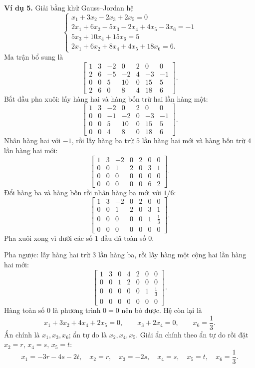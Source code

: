 \documentclass[12pt,a4paper]{article}
\begin{document}
\textbf{Ví dụ 5.} Giải bằng khử Gauss--Jordan hệ
$$
\begin{cases}
x_1+3x_2-2x_3+2x_5=0 \\
2x_1+6x_2-5x_3-2x_4+4x_5-3x_6=-1 \\
5x_3+10x_4+15x_6=5 \\
2x_1+6x_2+8x_4+4x_5+18x_6=6.
\end{cases}
$$
Ma trận bổ sung là
$$
\left[ \begin{array}{cccccc|c} 1 & 3 & -2 & 0 & 2 & 0 & 0 \\ 2 & 6 & -5 & -2 & 4 & -3 & -1 \\ 0 & 0 & 5 & 10 & 0 & 15 & 5 \\ 2 & 6 & 0 & 8 & 4 & 18 & 6 \end{array} \right].
$$
Bắt đầu pha xuôi: lấy hàng hai và hàng bốn trừ hai lần hàng một:
$$
\left[ \begin{array}{cccccc|c} 1 & 3 & -2 & 0 & 2 & 0 & 0 \\ 0 & 0 & -1 & -2 & 0 & -3 & -1 \\ 0 & 0 & 5 & 10 & 0 & 15 & 5 \\ 0 & 0 & 4 & 8 & 0 & 18 & 6 \end{array} \right].
$$
Nhân hàng hai với \(-1\), rồi lấy hàng ba trừ \(5\) lần hàng hai mới và hàng bốn trừ \(4\) lần hàng hai mới:
$$
\left[ \begin{array}{cccccc|c} 1 & 3 & -2 & 0 & 2 & 0 & 0 \\ 0 & 0 & 1 & 2 & 0 & 3 & 1 \\ 0 & 0 & 0 & 0 & 0 & 0 & 0 \\ 0 & 0 & 0 & 0 & 0 & 6 & 2 \end{array} \right].
$$
Đổi hàng ba và hàng bốn rồi nhân hàng ba mới với \(1/6\):
$$
\left[ \begin{array}{cccccc|c} 1 & 3 & -2 & 0 & 2 & 0 & 0 \\ 0 & 0 & 1 & 2 & 0 & 3 & 1 \\ 0 & 0 & 0 & 0 & 0 & 1 & \frac13 \\ 0 & 0 & 0 & 0 & 0 & 0 & 0 \end{array} \right].
$$
Pha xuôi xong vì dưới các số \(1\) đầu đã toàn số \(0\).

Pha ngược: lấy hàng hai trừ \(3\) lần hàng ba, rồi lấy hàng một cộng hai lần hàng hai mới:
$$
\left[ \begin{array}{cccccc|c} 1 & 3 & 0 & 4 & 2 & 0 & 0 \\ 0 & 0 & 1 & 2 & 0 & 0 & 0 \\ 0 & 0 & 0 & 0 & 0 & 1 & \frac13 \\ 0 & 0 & 0 & 0 & 0 & 0 & 0 \end{array} \right].
$$
Hàng toàn số \(0\) là phương trình \(0=0\) nên bỏ được. Hệ còn lại là
$$
x_1+3x_2+4x_4+2x_5=0,\qquad x_3+2x_4=0,\qquad x_6=\frac13. \tag{1}
$$
Ẩn chính là \(x_1,x_3,x_6\); ẩn tự do là \(x_2,x_4,x_5\). Giải ẩn chính theo ẩn tự do rồi đặt \(x_2=r\), \(x_4=s\), \(x_5=t\):
$$
x_1=-3r-4s-2t,\quad x_2=r,\quad x_3=-2s,\quad x_4=s,\quad x_5=t,\quad x_6=\frac13.
$$
\end{document}
